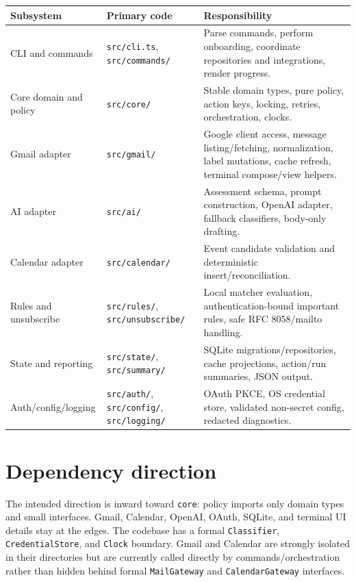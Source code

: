 \documentclass[12pt,oneside]{book}
\newcommand{\code}[1]{\nolinkurl{#1}}
\newcommand{\file}[1]{\nolinkurl{#1}}
\begin{document}
\begin{center}
\begingroup\small
\begin{tabularx}{\textwidth}{P{3.3cm}Y Y}
\toprule
\textbf{Subsystem} & \textbf{Primary code} & \textbf{Responsibility} \\
\midrule
CLI and commands & \file{src/cli.ts}, \file{src/commands/} & Parse commands, perform onboarding, coordinate repositories and integrations, render progress. \\
Core domain and policy & \file{src/core/} & Stable domain types, pure policy, action keys, locking, retries, orchestration, clocks. \\
Gmail adapter & \file{src/gmail/} & Google client access, message listing/fetching, normalization, label mutations, cache refresh, terminal compose/view helpers. \\
AI adapter & \file{src/ai/} & Assessment schema, prompt construction, OpenAI adapter, fallback classifiers, body-only drafting. \\
Calendar adapter & \file{src/calendar/} & Event candidate validation and deterministic insert/reconciliation. \\
Rules and unsubscribe & \file{src/rules/}, \file{src/unsubscribe/} & Local matcher evaluation, authentication-bound important rules, safe RFC 8058/mailto handling. \\
State and reporting & \file{src/state/}, \file{src/summary/} & SQLite migrations/repositories, cache projections, action/run summaries, JSON output. \\
Auth/config/logging & \file{src/auth/}, \file{src/config/}, \file{src/logging/} & OAuth PKCE, OS credential store, validated non-secret config, redacted diagnostics. \\
\bottomrule
\end{tabularx}
\endgroup
\end{center}

\section{Dependency direction}

The intended direction is inward toward \code{core}: policy imports only domain types and small interfaces. Gmail, Calendar, OpenAI, OAuth, SQLite, and terminal UI details stay at the edges. The codebase has a formal \code{Classifier}, \code{CredentialStore}, and \code{Clock} boundary. Gmail and Calendar are strongly isolated in their directories but are currently called directly by commands/orchestration rather than hidden behind formal \code{MailGateway} and \code{CalendarGateway} interfaces.
\end{document}
